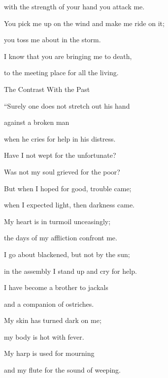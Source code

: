 {\par }{\Q with the strength
of your hand
you attack me.
\par }{\Q {}You pick
me up on the wind
and make me ride
on it;

\par }{\Q you toss
me about in the storm.
\par }{\Q {}I know
that you are bringing
me to death,
\par }{\Q to the meeting
place for all
the living.
\par }{\SH The Contrast With the Past
\par }{\Q {}“Surely
one does not
stretch out
his hand
\par }{\Q against a broken
man

\par }{\Q when
he cries for help
in his distress.
\par }{\Q {}Have I not
wept
for the unfortunate?

\par }{\Q Was not my soul
grieved
for the poor?
\par }{\Q {}But when
I hoped
for good,
trouble
came;
\par }{\Q when I expected
light,
then darkness
came.
\par }{\Q {}My heart
is in turmoil unceasingly;
\par }{\Q the days
of my affliction
confront me.
\par }{\Q {}I
go
about blackened, but not
by the sun;
\par }{\Q in the assembly
I stand
up and cry for help.
\par }{\Q {}I have become
a brother
to jackals
\par }{\Q and a companion
of ostriches.
\par }{\Q {}My skin
has turned dark
on
me;

\par }{\Q my body
is hot
with
fever.
\par }{\Q {}My harp
is used for mourning
\par }{\Q and my flute
for the sound
of weeping.

}
